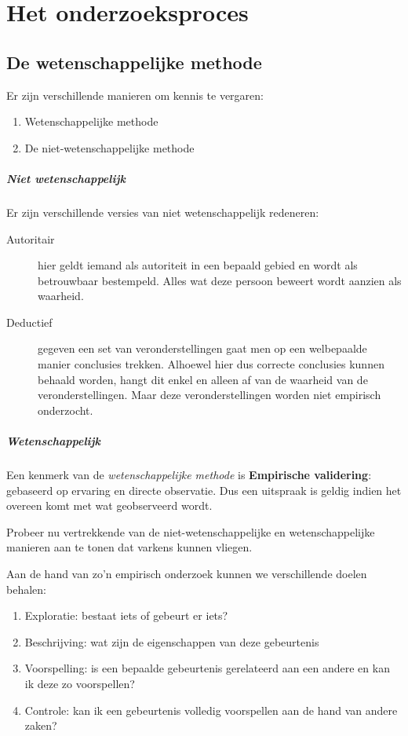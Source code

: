 \chapter{Het onderzoeksproces}

\section{De wetenschappelijke methode}

Er zijn verschillende manieren om kennis te vergaren:

\begin{enumerate}
	\item Wetenschappelijke methode
	\item De niet-wetenschappelijke methode
\end{enumerate}

\paragraph{Niet wetenschappelijk}Er zijn verschillende versies van niet wetenschappelijk redeneren: 
\begin{description}
	\item [Autoritair] hier geldt iemand als autoriteit in een bepaald gebied en wordt als betrouwbaar bestempeld. Alles wat deze persoon beweert wordt aanzien als waarheid. 
	\item [Deductief] gegeven een set van veronderstellingen gaat men op een welbepaalde manier conclusies trekken. Alhoewel hier dus correcte conclusies kunnen behaald worden, hangt dit enkel en alleen af van de waarheid van de veronderstellingen. Maar deze veronderstellingen worden niet empirisch onderzocht.
\end{description}

\paragraph{Wetenschappelijk}
Een kenmerk van de \textsl{wetenschappelijke methode} is \textbf{Empirische validering}: gebaseerd op ervaring en directe observatie. Dus een uitspraak is geldig indien het overeen komt met wat geobserveerd wordt.

\begin{exercise}
Probeer nu vertrekkende van de niet-wetenschappelijke en wetenschappelijke manieren aan te tonen dat varkens kunnen vliegen. 
\end{exercise}

Aan de hand van zo'n empirisch onderzoek kunnen we verschillende doelen behalen:
\begin{enumerate}
	\item Exploratie: bestaat iets of gebeurt er iets?
	\item Beschrijving: wat zijn de eigenschappen van deze gebeurtenis
	\item Voorspelling: is een bepaalde gebeurtenis gerelateerd aan een andere en kan ik deze zo voorspellen?
	\item Controle: kan ik een gebeurtenis volledig voorspellen aan de hand van andere zaken?
\end{enumerate}


